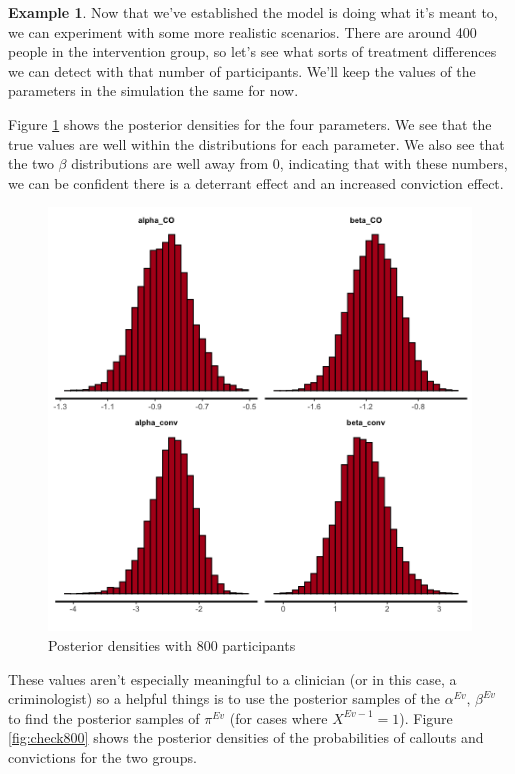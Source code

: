 \documentclass[
  openany]{book}
\theoremstyle{definition}
\theoremstyle{definition}
\newtheorem{example}{Example}[chapter]
\theoremstyle{definition}
\theoremstyle{definition}
\theoremstyle{remark}
\begin{document}
\begin{example}
Now that we've established the model is doing what it's meant to, we can experiment with some more realistic scenarios.
There are around 400 people in the intervention group, so let's see what sorts of treatment differences we can detect with that number of participants. We'll keep the values of the parameters in the simulation the same for now.

Figure \ref{fig:par800} shows the posterior densities for the four parameters. We see that the true values are well within the distributions for each parameter. We also see that the two \(\beta\) distributions are well away from 0, indicating that with these numbers, we can be confident there is a deterrant effect and an increased conviction effect.

\begin{figure}
\includegraphics[width=6.67in]{images/ggpostparam800} \caption{Posterior densities with 800 participants}\label{fig:par800}
\end{figure}

These values aren't especially meaningful to a clinician (or in this case, a criminologist) so a helpful things is to use the posterior samples of the \(\alpha^{Ev},\,\beta^{Ev}\) to find the posterior samples of \(\pi^{Ev}\) (for cases where \(X^{Ev-1}=1\)).
Figure \ref{fig:check800} shows the posterior densities of the probabilities of callouts and convictions for the two groups.


\end{example}
\end{document}
